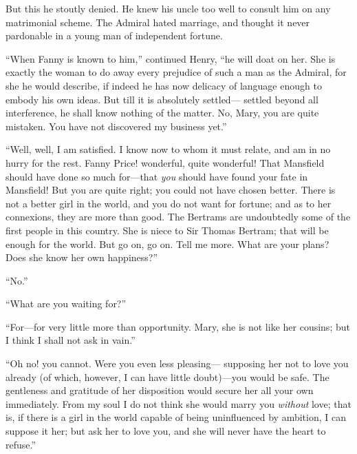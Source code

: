 \documentclass{article}
\begin{document}
But this he stoutly denied.  He knew his uncle too well
to consult him on any matrimonial scheme.  The Admiral
hated marriage, and thought it never pardonable in a young
man of independent fortune.

``When Fanny is known to him,'' continued Henry, ``he will doat
on her.  She is exactly the woman to do away every prejudice
of such a man as the Admiral, for she he would describe,
if indeed he has now delicacy of language enough to embody
his own ideas.  But till it is absolutely settled---%
settled beyond all interference, he shall know nothing
of the matter.  No, Mary, you are quite mistaken.
You have not discovered my business yet.''

``Well, well, I am satisfied.  I know now to whom
it must relate, and am in no hurry for the rest.
Fanny Price! wonderful, quite wonderful!  That Mansfield
should have done so much for---that \emph{you} should have
found your fate in Mansfield!  But you are quite right;
you could not have chosen better.  There is not a better
girl in the world, and you do not want for fortune;
and as to her connexions, they are more than good.
The Bertrams are undoubtedly some of the first people
in this country.  She is niece to Sir Thomas Bertram;
that will be enough for the world.  But go on, go on.
Tell me more.  What are your plans?  Does she know her
own happiness?''

``No.''

``What are you waiting for?''

``For---for very little more than opportunity.  Mary, she is
not like her cousins; but I think I shall not ask in vain.''

``Oh no! you cannot.  Were you even less pleasing---%
supposing her not to love you already (of which,
however, I can have little doubt)---you would be safe.
The gentleness and gratitude of her disposition would
secure her all your own immediately.  From my soul I do
not think she would marry you \emph{without} love; that is,
if there is a girl in the world capable of being uninfluenced
by ambition, I can suppose it her; but ask her to love you,
and she will never have the heart to refuse.''
\end{document}
